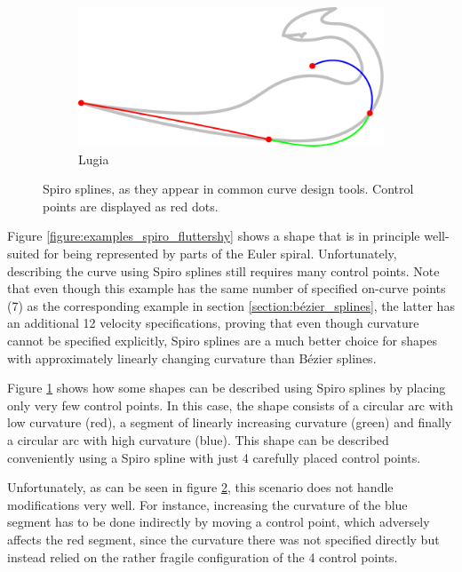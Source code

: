 \documentclass[a4paper]{article}
\begin{document}
\begin{figure}[htb]
\begin{minipage}[b]{\textwidth / 2}
\begin{subfigure}[b]{\textwidth}
							\label{figure:examples_spiro_lugia_1}
						\end{subfigure}
						\begin{subfigure}[b]{\textwidth}
							\includegraphics[width=\textwidth]{content/output/examples_spiro_lugia_2.pdf}
							\caption{Lugia \cite{lugia}}
							\label{figure:examples_spiro_lugia_2}
						\end{subfigure}
					\end{minipage}
					\caption{Spiro splines, as they appear in common curve design tools. Control points are displayed as red dots.}
					\label{figure:examples_spiro}
				\end{figure}

				Figure \ref{figure:examples_spiro_fluttershy} shows a shape that is in principle well-suited for being represented by parts of the Euler spiral. Unfortunately, describing the curve using Spiro splines still requires many control points. Note that even though this example has the same number of specified on-curve points (7) as the corresponding example in section \ref{section:bézier_splines}, the latter has an additional 12 velocity specifications, proving that even though curvature cannot be specified explicitly, Spiro splines are a much better choice for shapes with approximately linearly changing curvature than Bézier splines.

				Figure \ref{figure:examples_spiro_lugia_1} shows how some shapes can be described using Spiro splines by placing only very few control points. In this case, the shape consists of a circular arc with low curvature (red), a segment of linearly increasing curvature (green) and finally a circular arc with high curvature (blue). This shape can be described conveniently using a Spiro spline with just 4 carefully placed control points.

				Unfortunately, as can be seen in figure \ref{figure:examples_spiro_lugia_2}, this scenario does not handle modifications very well. For instance, increasing the curvature of the blue segment has to be done indirectly by moving a control point, which adversely affects the red segment, since the curvature there was not specified directly but instead relied on the rather fragile configuration of the 4 control points.
\end{document}
